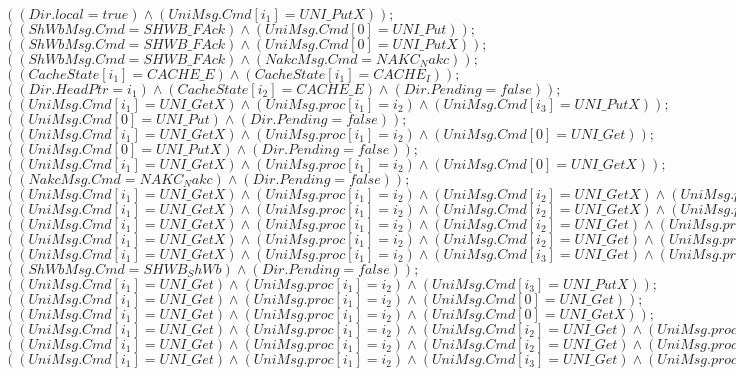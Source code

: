 \documentclass{llncs}
\begin{document}
\begin{itemize}
$( ( Dir.local=true)  \wedge ( UniMsg.Cmd[i_1]=UNI\_PutX)  ) ;$
$( ( ShWbMsg.Cmd=SHWB\_FAck)  \wedge ( UniMsg.Cmd[0]=UNI\_Put)  ) ;$
$( ( ShWbMsg.Cmd=SHWB\_FAck)  \wedge ( UniMsg.Cmd[0]=UNI\_PutX)  ) ;$
$( ( ShWbMsg.Cmd=SHWB\_FAck)  \wedge ( NakcMsg.Cmd=NAKC_Nakc)  ) ;$
$( ( CacheState[i_1]=CACHE\_E)  \wedge ( CacheState[i_1]=CACHE_I)  ) ;$
$( ( Dir.HeadPtr=i_1)  \wedge ( CacheState[i_2]=CACHE\_E)  \wedge ( Dir.Pending=false)  ) ;$
$( ( UniMsg.Cmd[i_1]=UNI\_GetX)  \wedge ( UniMsg.proc[i_1]=i_2)  \wedge ( UniMsg.Cmd[i_3]=UNI\_PutX)  ) ;$
$( ( UniMsg.Cmd[0]=UNI\_Put)  \wedge ( Dir.Pending=false)  ) ;$
$( ( UniMsg.Cmd[i_1]=UNI\_GetX)  \wedge ( UniMsg.proc[i_1]=i_2)  \wedge ( UniMsg.Cmd[0]=UNI\_Get)  ) ;$
$( ( UniMsg.Cmd[0]=UNI\_PutX)  \wedge ( Dir.Pending=false)  ) ;$
$( ( UniMsg.Cmd[i_1]=UNI\_GetX)  \wedge ( UniMsg.proc[i_1]=i_2)  \wedge ( UniMsg.Cmd[0]=UNI\_GetX)  ) ;$
$( ( NakcMsg.Cmd=NAKC_Nakc)  \wedge ( Dir.Pending=false)  ) ;$
$( ( UniMsg.Cmd[i_1]=UNI\_GetX)  \wedge ( UniMsg.proc[i_1]=i_2)  \wedge ( UniMsg.Cmd[i_2]=UNI\_GetX)  \wedge ( UniMsg.proc[i_2]=i_1)  ) ;$
$( ( UniMsg.Cmd[i_1]=UNI\_GetX)  \wedge ( UniMsg.proc[i_1]=i_2)  \wedge ( UniMsg.Cmd[i_2]=UNI\_GetX)  \wedge ( UniMsg.proc[i_2]=i_3)  ) ;$
$( ( UniMsg.Cmd[i_1]=UNI\_GetX)  \wedge ( UniMsg.proc[i_1]=i_2)  \wedge ( UniMsg.Cmd[i_2]=UNI\_Get)  \wedge ( UniMsg.proc[i_2]=i_1)  ) ;$
$( ( UniMsg.Cmd[i_1]=UNI\_GetX)  \wedge ( UniMsg.proc[i_1]=i_2)  \wedge ( UniMsg.Cmd[i_2]=UNI\_Get)  \wedge ( UniMsg.proc[i_2]=i_3)  ) ;$
$( ( UniMsg.Cmd[i_1]=UNI\_GetX)  \wedge ( UniMsg.proc[i_1]=i_2)  \wedge ( UniMsg.Cmd[i_3]=UNI\_Get)  \wedge ( UniMsg.proc[i_3]=i_1)  ) ;$
$( ( ShWbMsg.Cmd=SHWB_ShWb)  \wedge ( Dir.Pending=false)  ) ;$
$( ( UniMsg.Cmd[i_1]=UNI\_Get)  \wedge ( UniMsg.proc[i_1]=i_2)  \wedge ( UniMsg.Cmd[i_3]=UNI\_PutX)  ) ;$
$( ( UniMsg.Cmd[i_1]=UNI\_Get)  \wedge ( UniMsg.proc[i_1]=i_2)  \wedge ( UniMsg.Cmd[0]=UNI\_Get)  ) ;$
$( ( UniMsg.Cmd[i_1]=UNI\_Get)  \wedge ( UniMsg.proc[i_1]=i_2)  \wedge ( UniMsg.Cmd[0]=UNI\_GetX)  ) ;$
$( ( UniMsg.Cmd[i_1]=UNI\_Get)  \wedge ( UniMsg.proc[i_1]=i_2)  \wedge ( UniMsg.Cmd[i_2]=UNI\_Get)  \wedge ( UniMsg.proc[i_2]=i_1)  ) ;$
$( ( UniMsg.Cmd[i_1]=UNI\_Get)  \wedge ( UniMsg.proc[i_1]=i_2)  \wedge ( UniMsg.Cmd[i_2]=UNI\_Get)  \wedge ( UniMsg.proc[i_2]=i_3)  ) ;$
$( ( UniMsg.Cmd[i_1]=UNI\_Get)  \wedge ( UniMsg.proc[i_1]=i_2)  \wedge ( UniMsg.Cmd[i_3]=UNI\_Get)  \wedge ( UniMsg.proc[i_3]=i_2)  ) ;$


\end{itemize}
\end{document}
